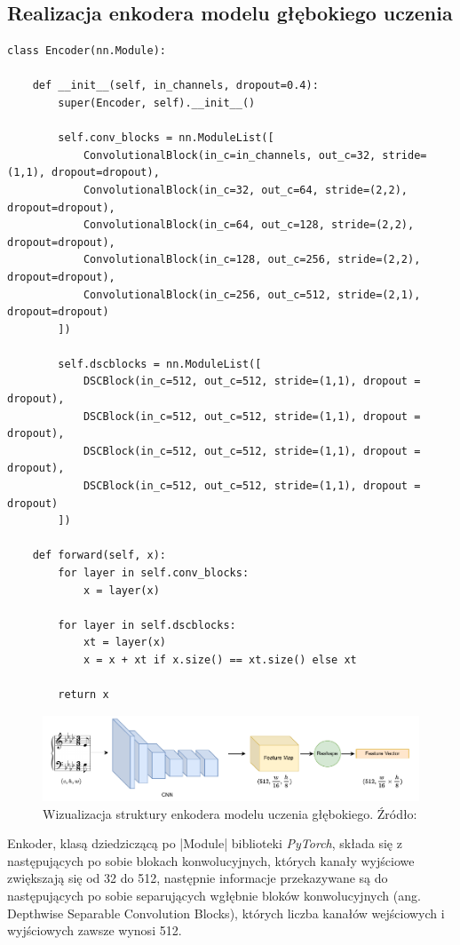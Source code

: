 \subsection{Realizacja enkodera modelu głębokiego uczenia} \label{Encoder}
\begin{lstlisting}[caption={\pyth|Encoder| - klasa enkodera modelu głębokiego uczenia}, label={encoder}]
class Encoder(nn.Module):
	
	def __init__(self, in_channels, dropout=0.4):
		super(Encoder, self).__init__()
	
		self.conv_blocks = nn.ModuleList([
			ConvolutionalBlock(in_c=in_channels, out_c=32, stride=(1,1), dropout=dropout),
			ConvolutionalBlock(in_c=32, out_c=64, stride=(2,2), dropout=dropout),
			ConvolutionalBlock(in_c=64, out_c=128, stride=(2,2), dropout=dropout),
			ConvolutionalBlock(in_c=128, out_c=256, stride=(2,2), dropout=dropout),
			ConvolutionalBlock(in_c=256, out_c=512, stride=(2,1), dropout=dropout)
		])
		
		self.dscblocks = nn.ModuleList([
			DSCBlock(in_c=512, out_c=512, stride=(1,1), dropout = dropout),
			DSCBlock(in_c=512, out_c=512, stride=(1,1), dropout = dropout),
			DSCBlock(in_c=512, out_c=512, stride=(1,1), dropout = dropout),
			DSCBlock(in_c=512, out_c=512, stride=(1,1), dropout = dropout)
		])
	
	def forward(self, x):
		for layer in self.conv_blocks:
			x = layer(x)
	
		for layer in self.dscblocks:
			xt = layer(x)
			x = x + xt if x.size() == xt.size() else xt
	
		return x
\end{lstlisting}

\begin{figure}[h]
	\centering
	\includegraphics[width=15cm]{images/encoder-model.png}
	\caption{Wizualizacja struktury enkodera modelu uczenia głębokiego. Źródło: \cite{Rios-Vila2023}}
	\label{fig:encoder-model-vis}
\end{figure}

Enkoder, klasą dziedziczącą po \pyth|Module| biblioteki \textit{PyTorch}, składa się z następujących po sobie blokach konwolucyjnych, których kanały wyjściowe zwiększają się od 32 do 512, następnie informacje przekazywane są do następujących po sobie separujących wgłębnie bloków konwolucyjnych (ang. Depthwise Separable Convolution Blocks), których liczba kanałów wejściowych i wyjściowych zawsze wynosi 512.

